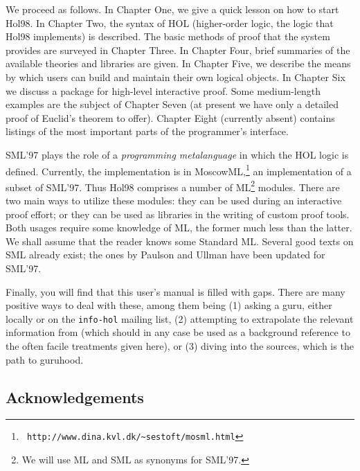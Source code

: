 \documentclass[12pt,fleqn,a4paper]{report}
\begin{document}
  We proceed as follows. In Chapter One, we give a quick lesson on how
 to start Hol98.  In Chapter Two, the syntax of HOL (higher-order logic,
 the logic that Hol98 implements) is described. The basic methods of
 proof that the system provides are surveyed in Chapter Three. In
 Chapter Four, brief summaries of the available theories and libraries
 are given. In Chapter Five, we describe the means by which users can
 build and maintain their own logical objects. In Chapter Six we discuss
 a package for high-level interactive proof. Some medium-length
 examples are the subject of Chapter Seven (at present we have only a
 detailed proof of Euclid's theorem to offer).  Chapter Eight (currently
 absent) contains listings of the most important parts of the
 programmer's interface.


SML'97 \cite{SML97} plays the role of a {\it programming metalanguage\/}
 in which the HOL logic is defined. Currently, the implementation is in
 MoscowML,\footnote{\tt
 http://www.dina.kvl.dk/\~{}sestoft/mosml.html}
 an implementation of a subset of SML'97.  Thus Hol98 comprises a number
 of ML\footnote{We will use ML and SML as synonyms for SML'97.}
 modules. There are two main ways to utilize these modules: they can be
 used during an interactive proof effort; or they can be used as
 libraries in the writing of custom proof tools.  Both usages require
 some knowledge of ML, the former much less than the latter. We shall
 assume that the reader knows some Standard ML. Several good texts on
 SML already exist; the ones by Paulson \cite{lcp:ml} and Ullman
 \cite{ullman:mlbook} have been updated for SML'97.

 Finally, you will find that this user's manual is filled with
 gaps. There are many positive ways to deal with these, among them being
 (1) asking a guru, either locally or on the \verb+info-hol+ mailing
 list, (2) attempting to extrapolate the relevant information from
 \cite{hol88:book} (which should in any case be used as a background
 reference to the often facile treatments given here), or (3) diving
 into the sources, which is the path to guruhood.

\subsection*{Acknowledgements}
\end{document}
